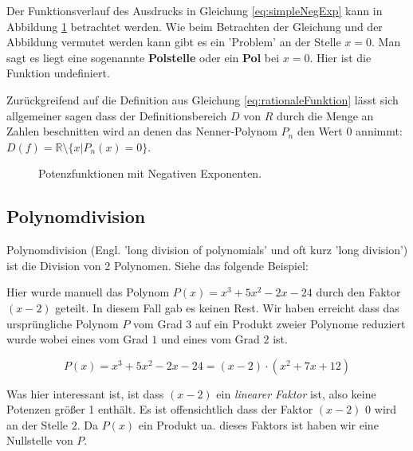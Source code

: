 Der Funktionsverlauf des Ausdrucks in Gleichung \ref{eq:simpleNegExp} kann in Abbildung \ref{fig:ratio1} betrachtet werden. Wie beim Betrachten der Gleichung und der Abbildung vermutet werden kann gibt es ein 'Problem' an der Stelle $x=0$. Man sagt es liegt eine sogenannte \textbf{Polstelle} oder ein \textbf{Pol} bei $x=0$. Hier ist die Funktion undefiniert. 

Zurückgreifend auf die Definition aus Gleichung \ref{eq:rationaleFunktion} lässt sich allgemeiner sagen dass der Definitionsbereich $D$ von $R$ durch die Menge an Zahlen beschnitten wird an denen das Nenner-Polynom $P_n$ den Wert 0 annimmt: $D(f) = \mathbb{R} \setminus \{x | P_n(x)=0\}$. 


\begin{figure}[H]
	\centering
	
	\caption{Potenzfunktionen mit Negativen Exponenten.}
	\label{fig:ratio1}
\end{figure}



\subsection{Polynomdivision}
Polynomdivision (Engl. 'long division of polynomials' und oft kurz 'long division') ist die Division von 2 Polynomen. Siehe das folgende Beispiel:



Hier wurde manuell das Polynom $P(x) = x^{3} + 5 x^{2} - 2 x - 24$ durch den Faktor $(x-2)$ geteilt. In diesem Fall gab es keinen Rest. Wir haben erreicht dass das ursprüngliche Polynom $P$ vom Grad $3$ auf ein Produkt zweier Polynome reduziert wurde wobei eines vom Grad $1$ und eines vom Grad $2$ ist. 

$$P(x) = x^{3} + 5 x^{2} - 2 x - 24 = (x-2) \cdot (x^2 + 7x + 12)$$


Was hier interessant ist, ist dass $(x-2)$ ein \emph{linearer Faktor} ist, also keine Potenzen größer 1 enthält. Es ist offensichtlich dass der Faktor $(x-2)$ $0$ wird an der Stelle $2$. Da $P(x)$ ein Produkt ua. dieses Faktors ist haben wir eine Nullstelle von $P$.


